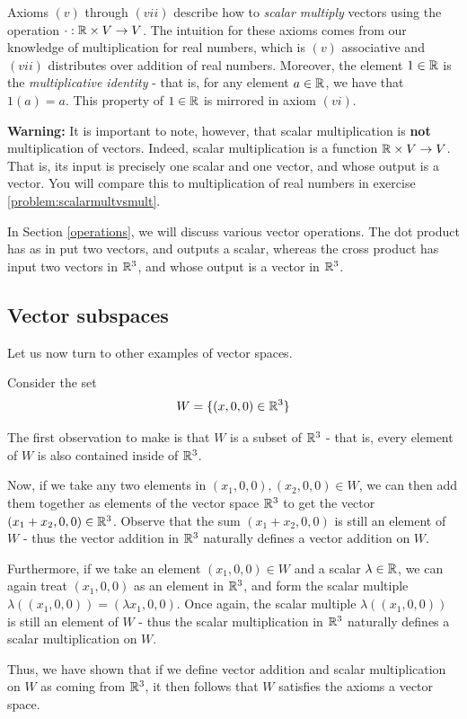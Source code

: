     Axioms $(v)$ through $(vii)$ describe how to \textit{scalar multiply} vectors using the operation $\cdot : \mathbb{R} \times V \to V$.  The intuition for these axioms comes from our knowledge of multiplication for real numbers, which is $(v)$ associative and $(vii)$ distributes over addition of real numbers.  Moreover, the element $1 \in \mathbb{R}$ is the \textit{multiplicative identity} - that is, for any element $a \in \mathbb{R}$, we have that $1(a) = a$.  This property of $1\in \mathbb{R}$ is mirrored in axiom $(vi)$.

    \begin{example}
    \textbf{Warning:} It is important to note, however, that scalar multiplication is \textbf{not} multiplication of vectors.  Indeed, scalar multiplication is a function $\mathbb{R} \times V \to V$.  That is, its input is precisely one scalar and one vector, and whose output is a vector.  You will compare this to multiplication of real numbers in exercise \ref{problem:scalarmultvsmult}.
    
    In Section \ref{operations}, we will discuss various vector operations.  The dot product has as in put two vectors, and outputs a scalar, whereas the cross product has input two vectors in $\mathbb{R}^3$, and whose output is a vector in $\mathbb{R}^3$.
    \end{example}
    
    \subsection{Vector subspaces}
    
    Let us now turn to other examples of vector spaces.
    
    \begin{example}
    Consider the set $$W = \{(x, 0, 0) \in \mathbb{R}^3 \}$$
    
    The first observation to make is that $W$ is a subset of $\mathbb{R}^3$ - that is, every element of $W$ is also contained inside of $\mathbb{R}^3$.  
    
    
    Now, if we take any two elements in $(x_1,0,0), (x_2,0,0) \in W$, we can then add them together as elements of the vector space $\mathbb{R}^3$ to get the vector $(x_1 + x_2, 0,0) \in \mathbb{R}^3$.  Observe that the sum $(x_1 + x_2, 0,0)$ is still an element of $W$ - thus the vector addition in $\mathbb{R}^3$ naturally defines a vector addition on $W$.
    
    Furthermore, if we take an element $(x_1,0,0) \in W$ and a scalar $\lambda \in \mathbb{R}$, we can again treat $(x_1,0,0)$ as an element in $\mathbb{R}^3$, and form the scalar multiple $\lambda((x_1,0,0)) = (\lambda x_1,0,0)$.  Once again, the scalar multiple $\lambda((x_1,0,0))$ is still an element of $W$ - thus the scalar multiplication in $\mathbb{R}^3$ naturally defines a scalar multiplication on $W$.
    
    Thus, we have shown that if we define vector addition and scalar multiplication on $W$ as coming from $\mathbb{R}^3$, it then follows that $W$ satisfies the axioms a vector space.
    \end{example}

